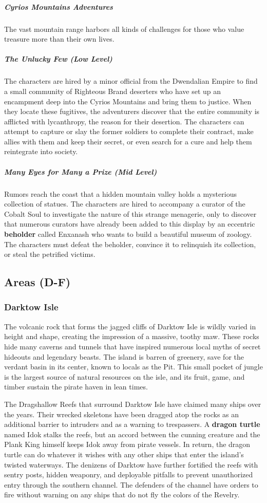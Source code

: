 \documentclass[10pt,a4paper,twoside,bg=print,twocolumn,openany,nodeprecatedcode]{dndbook}
\begin{document}
\subparagraph{Cyrios Mountains Adventures}
The vast mountain range harbors all kinds of challenges for those who value treasure more than their own lives.

\subparagraph{The Unlucky Few (Low Level)}
The characters are hired by a minor official from the Dwendalian Empire to find a small community of Righteous Brand deserters who have set up an encampment deep into the Cyrios Mountains and bring them to justice. When they locate these fugitives, the adventurers discover that the entire community is afflicted with lycanthropy, the reason for their desertion. The characters can attempt to capture or slay the former soldiers to complete their contract, make allies with them and keep their secret, or even search for a cure and help them reintegrate into society.

\subparagraph{Many Eyes for Many a Prize (Mid Level)}
Rumors reach the coast that a hidden mountain valley holds a mysterious collection of statues. The characters are hired to accompany a curator of the Cobalt Soul to investigate the nature of this strange menagerie, only to discover that numerous curators have already been added to this display by an eccentric \textbf{beholder} called Enxanash who wants to build a beautiful museum of zoology. The characters must defeat the beholder, convince it to relinquish its collection, or steal the petrified victims.

\subsection{Areas (D-F)}
\subsubsection{Darktow Isle}
The volcanic rock that forms the jagged cliffs of Darktow Isle is wildly varied in height and shape, creating the impression of a massive, toothy maw. These rocks hide many caverns and tunnels that have inspired numerous local myths of secret hideouts and legendary beasts. The island is barren of greenery, save for the verdant basin in its center, known to locals as the Pit. This small pocket of jungle is the largest source of natural resources on the isle, and its fruit, game, and timber sustain the pirate haven in lean times.

The Dragshallow Reefs that surround Darktow Isle have claimed many ships over the years. Their wrecked skeletons have been dragged atop the rocks as an additional barrier to intruders and as a warning to trespassers. A \textbf{dragon turtle} named Idok stalks the reefs, but an accord between the cunning creature and the Plank King himself keeps Idok away from pirate vessels. In return, the dragon turtle can do whatever it wishes with any other ships that enter the island's twisted waterways. The denizens of Darktow have further fortified the reefs with sentry posts, hidden weaponry, and deployable pitfalls to prevent unauthorized entry through the southern channel. The defenders of the channel have orders to fire without warning on any ships that do not fly the colors of the Revelry.
\end{document}
